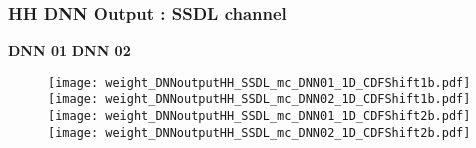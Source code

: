 \documentclass[9pt]{beamer}
\begin{document}
\begin{frame}
	\frametitle{HH DNN Output : SSDL channel}
	\hspace{2.0cm} \textbf{DNN 01} \hspace{4cm} \textbf{DNN 02} 
	\begin{figure}
		\texttt{[image: weight\_DNNoutputHH\_SSDL\_mc\_DNN01\_1D\_CDFShift1b.pdf]}
		\texttt{[image: weight\_DNNoutputHH\_SSDL\_mc\_DNN02\_1D\_CDFShift1b.pdf]}\\
		\texttt{[image: weight\_DNNoutputHH\_SSDL\_mc\_DNN01\_1D\_CDFShift2b.pdf]}
		\texttt{[image: weight\_DNNoutputHH\_SSDL\_mc\_DNN02\_1D\_CDFShift2b.pdf]}
	\end{figure}
\end{frame}
\end{document}
